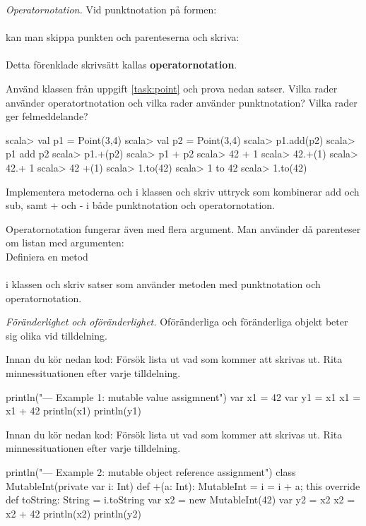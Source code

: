 \Task \emph{Operatornotation.} Vid punktnotation på formen: \\  \\ kan man skippa punkten och parenteserna och skriva:\\   \\
Detta förenklade skrivsätt kallas \textbf{operatornotation}.

\Subtask Använd klassen  från uppgift \ref{task:point} och prova nedan satser. Vilka rader använder operatortnotation och vilka rader använder punktnotation? Vilka rader ger felmeddelande?
\begin{REPL}
scala> val p1 = Point(3,4)
scala> val p2 = Point(3,4)
scala> p1.add(p2)
scala> p1 add p2
scala> p1.+(p2)
scala> p1 + p2
scala> 42 + 1
scala> 42.+(1)
scala> 42.+ 1
scala> 42 +(1)
scala> 1.to(42)
scala> 1 to 42
scala> 1.to(42)
\end{REPL}

\Subtask Implementera metoderna  och \code{-} i klassen  och skriv uttryck som kombinerar add och sub, samt + och - i både punktnotation och operatornotation.

\Subtask Operatornotation fungerar även med flera argument. Man använder då parenteser om listan med argumenten: 
  \\
Definiera en metod \\
 \\ 
i klassen  och skriv satser som använder metoden med punktnotation och operatornotation. 





\Task \emph{Föränderlighet och oföränderlighet.} Oföränderliga och föränderliga objekt beter sig olika vid tilldelning.  

\Subtask\Pen Innan du kör nedan kod: Försök lista ut vad som kommer att skrivas ut. Rita minnessituationen efter varje tilldelning. 

\begin{Code}
println("\n--- Example 1: mutable value assigmnent")
var x1 = 42
var y1 = x1
x1 = x1 + 42
println(x1)
println(y1)
\end{Code}

\Subtask\Pen Innan du kör nedan kod: Försök lista ut vad som kommer att skrivas ut. Rita minnessituationen efter varje tilldelning.

\begin{Code}
println("\n--- Example 2: mutable object reference assignment")
class MutableInt(private var i: Int) {
  def +(a: Int): MutableInt = { i = i + a; this }
  override def toString: String = i.toString
}
var x2 = new MutableInt(42)
var y2 = x2
x2 = x2 + 42
println(x2)
println(y2)
\end{Code}

